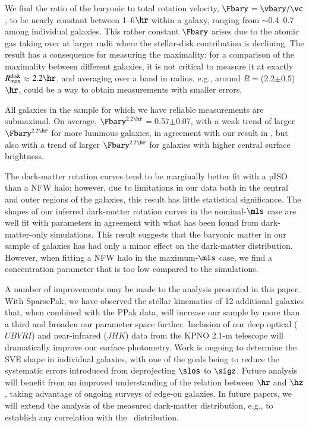 \documentclass[traditabstract]{aa} %
\begin{document}
We find the ratio of the baryonic to total rotation velocity, $\Fbary$$=$$\vbary/\vc$, to
be nearly constant between 1--6$\hr$ within a galaxy, ranging from $\sim$0.4--0.7 among
individual galaxies. This rather constant $\Fbary$ arises due to the atomic gas taking
over at larger radii where the stellar-disk contribution is declining. The result has a
consequence for measuring the maximality; for a comparison of the maximality between
different galaxies, it is not critical to measure it at exactly
$R_{\rm max}^{\rm disk}$$\approx$$2.2\hr$, and averaging over a band in radius, e.g.,
around $R$$=$(2.2$\pm$0.5)$\hr$, could be a way to obtain measurements with smaller errors.

All galaxies in the sample for which we have reliable measurements are submaximal.
On average, $\Fbary^{2.2\hr}$$=$0.57$\pm$0.07, with a weak trend of larger
$\Fbary^{2.2\hr}$ for more luminous galaxies, in agreement with our result in 
, but also with a trend of larger $\Fbary^{2.2\hr}$ for galaxies 
with higher central surface brightness.

The dark-matter rotation curves tend to be marginally better fit with a pISO than a NFW
halo; however, due to limitations in our data both in the central and outer regions of the
galaxies, this result has little statistical significance. The shapes of our inferred
dark-matter rotation curves in the nominal-$\mls$ case are well fit with parameters in
agreement with what has been found from dark-matter-only simulations. This result suggests
that the baryonic matter in our sample of galaxies has had only a minor effect on the
dark-matter distribution. However, when fitting a NFW halo in the maximum-$\mls$ case, we
find a concentration parameter that is too low compared to the simulations.

A number of improvements may be made to the analysis presented in this paper. With 
SparsePak, we have observed the stellar kinematics of 12 additional galaxies that, when 
combined with the PPak data, will increase our sample by more than a third and broaden our 
parameter space further. Inclusion of our deep optical ($UBVRI$) and near-infrared ($JHK$) 
data from the KPNO 2.1-m telescope will dramatically improve our surface photometry. Work 
is ongoing to determine the SVE shape in individual galaxies, with one of the goals being 
to reduce the systematic errors introduced from deprojecting $\slos$ to $\sigz$. Future 
analysis will benefit from an improved understanding of the relation between $\hr$ and 
$\hz$, taking advantage of ongoing surveys of edge-on galaxies. In future papers,
we will extend the analysis of the measured dark-matter distribution, e.g., to establish
any correlation with the \hone\ distribution.
\end{document}
